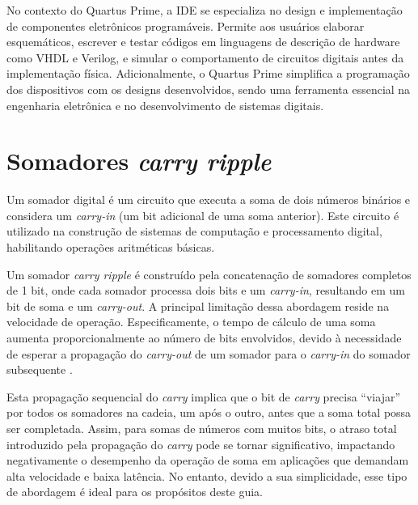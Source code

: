 \documentclass[12pt,a4paper]{article}
\begin{document}
No contexto do Quartus Prime, a IDE se especializa no design e implementação de componentes eletrônicos programáveis. Permite aos usuários elaborar esquemáticos, escrever e testar códigos em linguagens de descrição de hardware como VHDL e Verilog, e simular o comportamento de circuitos digitais antes da implementação física. Adicionalmente, o Quartus Prime simplifica a programação dos dispositivos com os designs desenvolvidos, sendo uma ferramenta essencial na engenharia eletrônica e no desenvolvimento de sistemas digitais.

\section{Somadores \textit{carry ripple}}

Um somador digital é um circuito que executa a soma de dois números binários e considera um \textit{carry-in} (um bit adicional de uma soma anterior). Este circuito é utilizado na construção de sistemas de computação e processamento digital, habilitando operações aritméticas básicas\cite{YouTube2020luiz,Tocci2007SistemasDigitais}.

Um somador \textit{carry ripple} é construído pela concatenação de somadores completos de 1 bit, onde cada somador processa dois bits e um \textit{carry-in}, resultando em um bit de soma e um \textit{carry-out}. A principal limitação dessa abordagem reside na velocidade de operação. Especificamente, o tempo de cálculo de uma soma aumenta proporcionalmente ao número de bits envolvidos, devido à necessidade de esperar a propagação do \textit{carry-out} de um somador para o \textit{carry-in} do somador subsequente \cite{YouTube2021descomplica}.

Esta propagação sequencial do \textit{carry} implica que o bit de \textit{carry} precisa ``viajar'' por todos os somadores na cadeia, um após o outro, antes que a soma total possa ser completada. Assim, para somas de números com muitos bits, o atraso total introduzido pela propagação do \textit{carry} pode se tornar significativo, impactando negativamente o desempenho da operação de soma em aplicações que demandam alta velocidade e baixa latência. No entanto, devido a sua simplicidade, esse tipo de abordagem é ideal para os propósitos deste guia.

\end{document}
